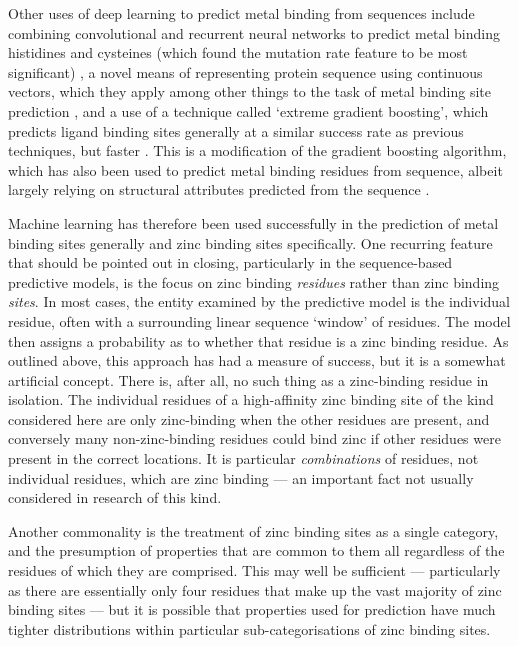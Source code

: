 Other uses of deep learning to predict metal binding from sequences include combining convolutional and recurrent neural networks to predict metal binding histidines and cysteines (which found the mutation rate feature to be most significant) \cite{Haberal2019}, a novel means of representing protein sequence using continuous vectors, which they apply among other things to the task of metal binding site prediction \cite{heinzinger2019}, and a use of a technique called `extreme gradient boosting', which predicts ligand binding sites generally at a similar success rate as previous techniques, but faster \cite{zhao2019}. This is a modification of the gradient boosting algorithm, which has also been used to predict metal binding residues from sequence, albeit largely relying on structural attributes predicted from the sequence \cite{hu2020}.

Machine learning has therefore been used successfully in the prediction of metal binding sites generally and zinc binding sites specifically. One recurring feature that should be pointed out in closing, particularly in the sequence-based
predictive models, is the focus on zinc binding \emph{residues} rather
than zinc binding \emph{sites}. In most cases, the entity examined by the predictive model
is the individual residue, often with a surrounding linear sequence `window'
of residues. The model then assigns a probability as to whether that
residue is a zinc binding residue. As outlined above, this approach has 
had a measure of success, but it is a somewhat artificial
concept. There is, after all, no such thing as a zinc-binding residue
in isolation. The individual residues of a high-affinity zinc binding
site of the kind considered here are only zinc-binding when the other
residues are present, and conversely many non-zinc-binding residues
could bind zinc if other residues were present in the correct
locations. It is particular \emph{combinations} of residues, not individual
residues, which are zinc binding --- an important fact not usually
considered in research of this kind.

Another commonality is the treatment of zinc binding sites as a single
category, and the presumption of properties that are common to them
all regardless of the residues of which they are comprised. This may
well be sufficient --- particularly as there are essentially only four
residues that make up the vast majority of zinc binding sites --- but
it is possible that properties used for prediction have much tighter
distributions within particular sub-categorisations of zinc binding
sites.

